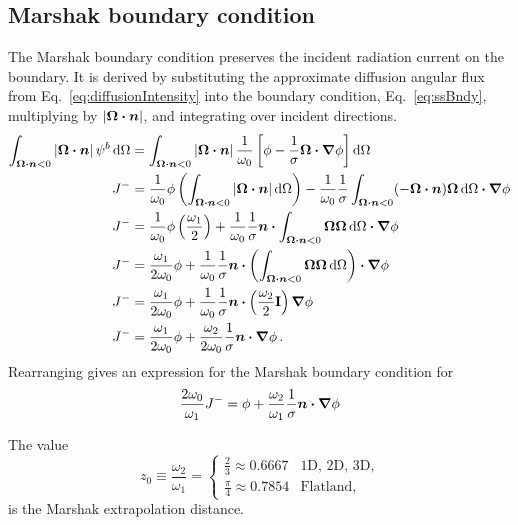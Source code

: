 \subsection{Marshak boundary condition}
The Marshak boundary condition \cite{Mar1947} preserves the incident radiation
current on the boundary. It is derived by substituting the approximate diffusion
angular flux from Eq.~\eqref{eq:diffusionIntensity} into the boundary condition,
Eq.~\eqref{eq:ssBndy}, multiplying by $\left| \bm{\Omega}\bm{\cdot} \bm{n} \right|$, and integrating over
incident directions.
\begin{align*}
\int_{\bm{\Omega}\bm{\cdot} \bm{n} < 0 } \left| \bm{\Omega}\bm{\cdot} \bm{n} \right|
\psi^b \mathop{}\!\mathrm{d}\Omega
 &= 
\int_{\bm{\Omega}\bm{\cdot} \bm{n} < 0 } \left| \bm{\Omega}\bm{\cdot} \bm{n} \right| 
 \frac{1}{\omega_0} \left[ \phi - \frac{1}{\sigma}
  \bm{\Omega} \bm{\cdot} \bm{\nabla} \phi \right]
  \mathop{}\!\mathrm{d}\Omega
\\
J^{-}
&= 
\frac{1}{\omega_0} \phi \left( \int_{\bm{\Omega}\bm{\cdot} \bm{n} < 0 }
\left| \bm{\Omega}\bm{\cdot} \bm{n} \right| \mathop{}\!\mathrm{d}\Omega \right) 
  - \frac{1}{\omega_0}\frac{1}{\sigma}
  \int_{\bm{\Omega}\bm{\cdot} \bm{n} < 0 } (-\bm{\Omega}\bm{\cdot} \bm{n})
  \bm{\Omega} \mathop{}\!\mathrm{d}\Omega  \bm{\cdot} \bm{\nabla} \phi
\\
J^{-}
&=
\frac{1}{\omega_0} \phi \left( \frac{\omega_1}{2} \right) 
  + \frac{1}{\omega_0}\frac{1}{\sigma} \bm{n} \bm{\cdot}
  \int_{\bm{\Omega}\bm{\cdot} \bm{n} < 0 } \bm{\Omega} \bm{\Omega} \mathop{}\!\mathrm{d}\Omega
  \bm{\cdot} \bm{\nabla} \phi
\\
J^{-}
&=
\frac{\omega_1}{2\omega_0} \phi 
  + \frac{1}{\omega_0}\frac{1}{\sigma} \bm{n} \bm{\cdot}
  \left( \int_{\bm{\Omega}\bm{\cdot} \bm{n} < 0 } \bm{\Omega} \bm{\Omega} \mathop{}\!\mathrm{d}\Omega \right)
  \bm{\cdot} \bm{\nabla} \phi
\\
J^{-}
&=
\frac{\omega_1}{2\omega_0} \phi
+ \frac{1}{\omega_0}\frac{1}{\sigma} \bm{n} \bm{\cdot} \left( \frac{\omega_2}{2}
\mathbf{I} \right) \bm{\nabla} \phi
\\
J^{-}
&=
\frac{\omega_1}{2\omega_0} \phi
+ \frac{\omega_2}{2\omega_0}\frac{1}{\sigma} \bm{n} \bm{\cdot} \bm{\nabla} \phi\,.
\end{align*}
Rearranging gives an expression for the Marshak boundary condition for 
\begin{equation} \label{eq:marshak}
\frac{2\omega_0}{\omega_1} J^{-}
=
\phi + \frac{\omega_2}{\omega_1}\frac{1}{\sigma} \bm{n} \bm{\cdot} \bm{\nabla} \phi
\end{equation}

The value
\begin{equation*}
  z_0 \equiv \frac{\omega_2}{\omega_1}
  =
  \begin{cases}
    \frac{2}{3} \approx 0.6667 & \text{1D, 2D, 3D,} \\
    \frac{\pi}{4} \approx 0.7854 & \text{Flatland,}
  \end{cases}
\end{equation*}
is the Marshak extrapolation distance.

